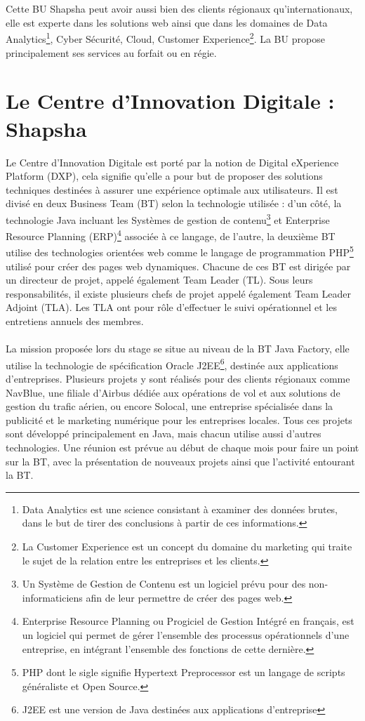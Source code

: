 \documentclass[12pt, a4paper]{report}
\begin{document}
	\\\\
	Cette BU Shapsha peut avoir aussi bien des clients régionaux qu'internationaux, elle est experte dans les solutions web ainsi que dans les domaines de Data Analytics\footnote{Data Analytics est une science consistant à examiner des données brutes, dans le but de tirer des conclusions à partir de ces informations.}, Cyber Sécurité, Cloud, Customer Experience\footnote{La Customer Experience est un concept du domaine du marketing qui traite le sujet de la relation entre les entreprises et les clients.}. La BU propose principalement ses services au forfait ou en régie.

	\section{Le Centre d'Innovation Digitale : Shapsha}

	Le Centre d'Innovation Digitale est porté par la notion de Digital eXperience Platform (DXP), cela signifie qu'elle a pour but de proposer des solutions techniques destinées à assurer une expérience optimale aux utilisateurs. Il est divisé en deux Business Team (BT) selon la technologie utilisée : d'un côté, la technologie Java incluant les Systèmes de gestion de contenu\footnote{Un Système de Gestion de Contenu est un logiciel prévu pour des non-informaticiens afin de leur permettre de créer des pages web.} et Enterprise Resource Planning (ERP)\footnote{Enterprise Resource Planning ou Progiciel de Gestion Intégré en français, est un logiciel qui permet de gérer l'ensemble des processus opérationnels d'une entreprise, en intégrant l'ensemble des fonctions de cette dernière.} associée à ce langage, de l'autre, la deuxième BT utilise des technologies orientées web comme le langage de programmation PHP\footnote{PHP dont le sigle signifie \flqq{} Hypertext Preprocessor \frqq{} est un langage de scripts généraliste et Open Source.} utilisé pour créer des pages web dynamiques. Chacune de ces BT est dirigée par un directeur de projet, appelé également \flqq{} Team Leader \frqq{} (TL). Sous leurs responsabilités, il existe plusieurs chefs de projet appelé également \flqq{} Team Leader Adjoint \frqq{} (TLA). Les TLA ont pour rôle d'effectuer le suivi opérationnel et les entretiens annuels des membres.
	\\\\
	La mission proposée lors du stage se situe au niveau de la BT Java Factory, elle utilise la technologie de spécification Oracle J2EE\footnote{J2EE est une version de Java destinées aux applications d'entreprise}, destinée aux applications d'entreprises. Plusieurs projets y sont réalisés pour des clients régionaux comme NavBlue, une filiale d'Airbus dédiée aux opérations de vol et aux solutions de gestion du trafic aérien, ou encore Solocal, une entreprise spécialisée dans la publicité et le marketing numérique pour les entreprises locales. Tous ces projets sont développé principalement en Java, mais chacun utilise aussi d'autres technologies. Une réunion est prévue au début de chaque mois pour faire un point sur la BT, avec la présentation de nouveaux projets ainsi que l'activité entourant la BT.
\end{document}

